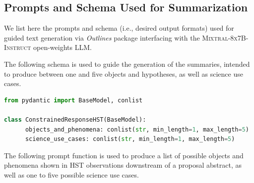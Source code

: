 \documentclass[10pt]{article} %
\newcommand{\package}[1]{\textsl{#1}\xspace}
\begin{document}
\subsection{Prompts and Schema Used for Summarization}
\label{app:summarization}

We list here the prompts and schema (i.e., desired output formats) used for guided text generation via \package{Outlines} package interfacing with the \textsc{Mixtral-8x7B-Instruct} open-weights LLM.

The following schema is used to guide the generation of the summaries, intended to produce between one and five objects and hypotheses, as well as science use cases. \\

\begin{lstlisting}[language=Python]
from pydantic import BaseModel, conlist

class ConstrainedResponseHST(BaseModel):
      objects_and_phenomena: conlist(str, min_length=1, max_length=5)
      science_use_cases: conlist(str, min_length=1, max_length=5)
\end{lstlisting}

The following prompt function is used to produce a list of possible objects and phenomena shown in HST observations downstream of a proposal abstract, as well as one to five possible science use cases. \\
\end{document}
